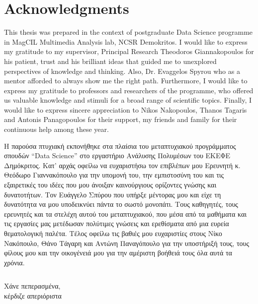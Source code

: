 
\chapter*{Acknowledgments}

This thesis was prepared in the context of postgraduate Data Science programme in MagCIL Multimedia Analysis lab, NCSR Demokritos.
I would like to express my gratitude to my supervisor, Principal Research Theodoros Giannakopoulos for his patient, trust and his brilliant ideas that guided me to unexplored perspectives of knowledge and thinking. Also, Dr. Evaggelos Spyrou who as a mentor afforded to always show me the right path. Furthermore, I would like to express my gratitude to professors and researchers of the programme, who offered us valuable knowledge and stimuli for a broad range of scientific topics.
Finally, I would like to express sincere appreciation to Nikos Nakopoulos, Thanos Tagaris and Antonis Panagopoulos for their support, my friends and family for their continuous help among these year.



Η παρούσα πτυχιακή εκπονήθηκε στα πλαίσια του μεταπτυχιακού προγράμματος σπουδών  ``Data Science''  στο εργαστήριο Ανάλυσης Πολυμέσων του ΕΚΕΦΕ Δημόκριτος.
Κατ' αρχάς οφείλω να ευχαριστήσω τον επιβλέπων μου Ερευνητή κ. Θεόδωρο Γιαννακόπουλο για την υπομονή του, την εμπιστοσύνη του και τις εξαιρετικές του ιδέες που μου άνοιξαν καινούργιους ορίζοντες γνώσης και δυνατοτήτων. Τον Ευάγγελο Σπύρου που υπήρξε μέντορας μου και είχε τη δυνατότητα να μου υποδεικνύει πάντα το σωστό μονοπάτι. Τους καθηγητές, τους ερευνητές και τα στελέχη αυτού του μεταπτυχιακού, που μέσα από τα μαθήματα και τις εργασίες μας μετέδωσαν πολύτιμες γνώσεις και ερεθίσματα από μια ευρεία θεματολογική παλέτα.
Τέλος οφείλω τις βαθιές μου ευχαριστίες στους Νίκο Νακόπουλο, Θάνο Τάγαρη και Αντώνη Παναγόπουλο για την υποστήριξή τους, τους φίλους μου και την οικογένειά μου για την αμέριστη βοήθειά τους όλα αυτά τα χρόνια.

\newpage

\[\ \]
\[\ \]
\[\ \]

\begin{large}
    \begin{flushright}
    Χάνε πεπερασμένα,\\ κέρδιζε απεριόριστα
    \end{flushright}
\end{large}

\newpage
